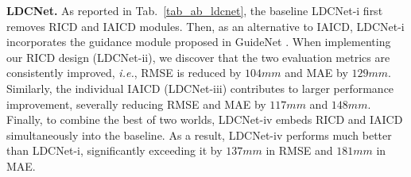 \documentclass[lettersize,journal]{IEEEtran}
\begin{document}
\textbf{LDCNet.} As reported in Tab.~\ref{tab_ab_ldcnet}, the baseline LDCNet-i 
first removes RICD and IAICD modules. Then, as an alternative to IAICD, LDCNet-i incorporates the guidance module proposed in GuideNet \cite{tang2020learning}. When implementing our RICD design (LDCNet-ii), we discover that the two evaluation metrics are consistently improved, \emph{i.e.}, RMSE is reduced by $104mm$ and MAE by $129mm$. Similarly, the individual IAICD (LDCNet-iii) contributes to larger performance improvement, severally reducing RMSE and MAE by $117mm$ and $148mm$. Finally, to combine the best of two worlds, LDCNet-iv embeds RICD and IAICD simultaneously into the baseline. As a result, LDCNet-iv performs much better than LDCNet-i, significantly exceeding it by $137mm$ in RMSE and $181mm$ in MAE. 

\begin{table}[t]
\centering
\scriptsize
\renewcommand\arraystretch{1.15}
\caption{Ablation on components of LDCNet.}
\label{tab_ab_ldcnet}
\vspace{-7pt}
\vspace{-7pt}
\end{table}

\begin{table}[t]
\centering
\scriptsize
\renewcommand\arraystretch{1.15}
\caption{Ablation on diverse-kernel RICD.}
\label{tab_ab_ricd}
\vspace{-7pt}
\vspace{-7pt}
\end{table}
\end{document}
